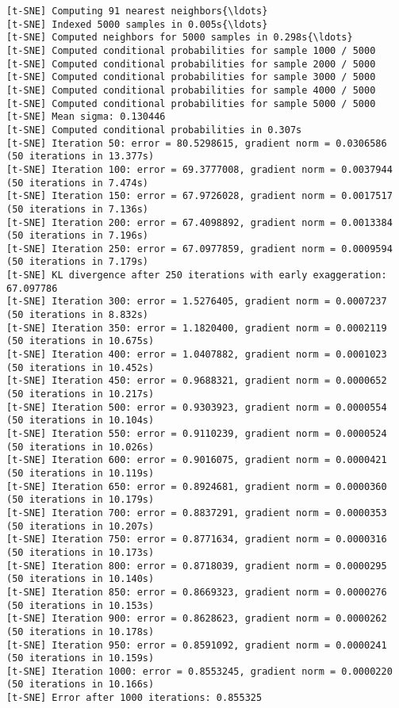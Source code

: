 \documentclass[11pt]{article}
\begin{document}
    \begin{Verbatim}[commandchars=\\\{\}]
[t-SNE] Computing 91 nearest neighbors{\ldots}
[t-SNE] Indexed 5000 samples in 0.005s{\ldots}
[t-SNE] Computed neighbors for 5000 samples in 0.298s{\ldots}
[t-SNE] Computed conditional probabilities for sample 1000 / 5000
[t-SNE] Computed conditional probabilities for sample 2000 / 5000
[t-SNE] Computed conditional probabilities for sample 3000 / 5000
[t-SNE] Computed conditional probabilities for sample 4000 / 5000
[t-SNE] Computed conditional probabilities for sample 5000 / 5000
[t-SNE] Mean sigma: 0.130446
[t-SNE] Computed conditional probabilities in 0.307s
[t-SNE] Iteration 50: error = 80.5298615, gradient norm = 0.0306586 (50 iterations in 13.377s)
[t-SNE] Iteration 100: error = 69.3777008, gradient norm = 0.0037944 (50 iterations in 7.474s)
[t-SNE] Iteration 150: error = 67.9726028, gradient norm = 0.0017517 (50 iterations in 7.136s)
[t-SNE] Iteration 200: error = 67.4098892, gradient norm = 0.0013384 (50 iterations in 7.196s)
[t-SNE] Iteration 250: error = 67.0977859, gradient norm = 0.0009594 (50 iterations in 7.179s)
[t-SNE] KL divergence after 250 iterations with early exaggeration: 67.097786
[t-SNE] Iteration 300: error = 1.5276405, gradient norm = 0.0007237 (50 iterations in 8.832s)
[t-SNE] Iteration 350: error = 1.1820400, gradient norm = 0.0002119 (50 iterations in 10.675s)
[t-SNE] Iteration 400: error = 1.0407882, gradient norm = 0.0001023 (50 iterations in 10.452s)
[t-SNE] Iteration 450: error = 0.9688321, gradient norm = 0.0000652 (50 iterations in 10.217s)
[t-SNE] Iteration 500: error = 0.9303923, gradient norm = 0.0000554 (50 iterations in 10.104s)
[t-SNE] Iteration 550: error = 0.9110239, gradient norm = 0.0000524 (50 iterations in 10.026s)
[t-SNE] Iteration 600: error = 0.9016075, gradient norm = 0.0000421 (50 iterations in 10.119s)
[t-SNE] Iteration 650: error = 0.8924681, gradient norm = 0.0000360 (50 iterations in 10.179s)
[t-SNE] Iteration 700: error = 0.8837291, gradient norm = 0.0000353 (50 iterations in 10.207s)
[t-SNE] Iteration 750: error = 0.8771634, gradient norm = 0.0000316 (50 iterations in 10.173s)
[t-SNE] Iteration 800: error = 0.8718039, gradient norm = 0.0000295 (50 iterations in 10.140s)
[t-SNE] Iteration 850: error = 0.8669323, gradient norm = 0.0000276 (50 iterations in 10.153s)
[t-SNE] Iteration 900: error = 0.8628623, gradient norm = 0.0000262 (50 iterations in 10.178s)
[t-SNE] Iteration 950: error = 0.8591092, gradient norm = 0.0000241 (50 iterations in 10.159s)
[t-SNE] Iteration 1000: error = 0.8553245, gradient norm = 0.0000220 (50 iterations in 10.166s)
[t-SNE] Error after 1000 iterations: 0.855325

    \end{Verbatim}
\end{document}
